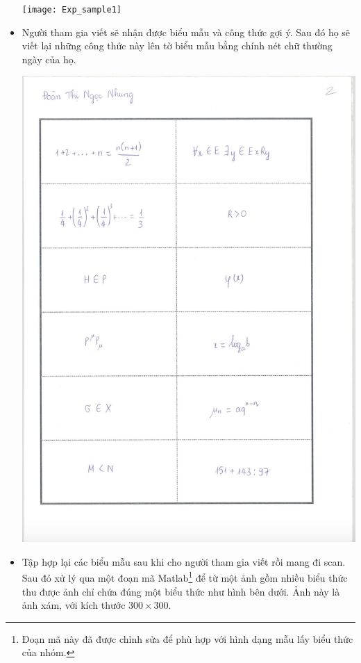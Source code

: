 \documentclass[a4paper,12pt]{article}
\begin{document}
\begin{itemize}
		\begin{center}
			\centering
			\texttt{[image: Exp\_sample1]}
			\vspace{0.5cm}
		\end{center}
		\item Người tham gia viết sẽ nhận được biểu mẫu và công thức gợi ý. Sau đó họ sẽ viết lại những công thức này lên tờ biểu mẫu bằng chính nét chữ thường ngày của họ. 
		\begin{center}
			\centering
			\includegraphics[width=0.8\linewidth]{Exp_sample_vd}
			\vspace{0.5cm}
		\end{center}
		\item Tập hợp lại các biểu mẫu sau khi cho người tham gia viết rồi mang đi scan. Sau đó xử lý qua một đoạn mã Matlab\cite{qak}\footnote{Đoạn mã này đã được chỉnh sửa để phù hợp với hình dạng mẫu lấy biểu thức của nhóm.} để từ một ảnh gồm nhiều biểu thức thu được ảnh chỉ chứa đúng một biểu thức như hình bên dưới. Ảnh này là ảnh xám, với kích thước $300\times300$.
		\begin{center}

\end{center}
\end{itemize}
\end{document}
